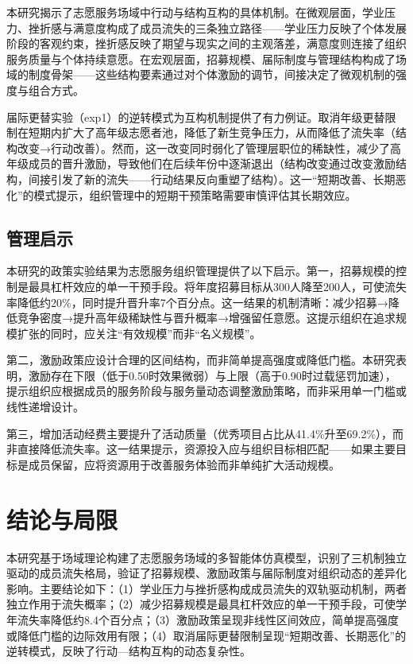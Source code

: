 \documentclass[12pt,a4paper]{article}
\begin{document}
本研究揭示了志愿服务场域中行动与结构互构的具体机制。在微观层面，学业压力、挫折感与满意度构成了成员流失的三条独立路径——学业压力反映了个体发展阶段的客观约束，挫折感反映了期望与现实之间的主观落差，满意度则连接了组织服务质量与个体持续意愿。在宏观层面，招募规模、届际制度与管理结构构成了场域的制度骨架——这些结构要素通过对个体激励的调节，间接决定了微观机制的强度与组合方式。

届际更替实验（exp1）的逆转模式为互构机制提供了有力例证。取消年级更替限制在短期内扩大了高年级志愿者池，降低了新生竞争压力，从而降低了流失率（结构改变→行动改善）。然而，这一改变同时弱化了管理层职位的稀缺性，减少了高年级成员的晋升激励，导致他们在后续年份中逐渐退出（结构改变通过改变激励结构，间接引发了新的流失——行动结果反向重塑了结构）。这一“短期改善、长期恶化”的模式提示，组织管理中的短期干预策略需要审慎评估其长期效应。

\subsection{管理启示}

本研究的政策实验结果为志愿服务组织管理提供了以下启示。第一，招募规模的控制是最具杠杆效应的单一干预手段。将年度招募目标从300人降至200人，可使流失率降低约20\%，同时提升晋升率7个百分点。这一结果的机制清晰：减少招募→降低竞争密度→提升高年级稀缺性与晋升概率→增强留任意愿。这提示组织在追求规模扩张的同时，应关注“有效规模”而非“名义规模”。

第二，激励政策应设计合理的区间结构，而非简单提高强度或降低门槛。本研究表明，激励存在下限（低于0.50时效果微弱）与上限（高于0.90时过载惩罚加速），提示组织应根据成员的服务阶段与服务量动态调整激励策略，而非采用单一门槛或线性递增设计。

第三，增加活动经费主要提升了活动质量（优秀项目占比从41.4\%升至69.2\%），而非直接降低流失率。这一结果提示，资源投入应与组织目标相匹配——如果主要目标是成员保留，应将资源用于改善服务体验而非单纯扩大活动规模。

\section{结论与局限}

本研究基于场域理论构建了志愿服务场域的多智能体仿真模型，识别了三机制独立驱动的成员流失格局，验证了招募规模、激励政策与届际制度对组织动态的差异化影响。主要结论如下：（1）学业压力与挫折感构成成员流失的双轨驱动机制，两者独立作用于流失概率；（2）减少招募规模是最具杠杆效应的单一干预手段，可使学年流失率降低约8.4个百分点；（3）激励政策呈现非线性区间效应，简单提高强度或降低门槛的边际效用有限；（4）取消届际更替限制呈现“短期改善、长期恶化”的逆转模式，反映了行动—结构互构的动态复杂性。
\end{document}
